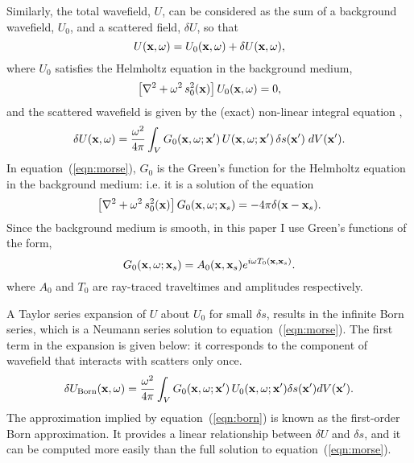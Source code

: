 \par
Similarly, the total wavefield, $U$, can be considered 
as the sum of a background wavefield, $U_0$, and a
scattered field, $\delta U$, so that 
\begin{equation}
U({\bf x},\omega)=U_0({\bf x},\omega)+\delta U({\bf x},\omega),
\end{equation}
where $U_0$ satisfies the Helmholtz equation in the background
medium,
\begin{equation}
\left[ \nabla^2 + \omega^2 \, s_0^2({\bf x})\right]
U_0({\bf x},\omega) = 0,
\end{equation}
and the scattered wavefield is given by the (exact) non-linear
integral equation \cite[]{morsefeshbach}, 
\begin{equation}\label{eqn:morse}
\delta U({\bf x},\omega)=\frac{\omega^2}{4 \pi}
\int_V G_0({\bf x},\omega; {\bf x}')\,U({\bf x},\omega; {\bf x}')
\, \delta s({\bf x}') \; dV({\bf x}').
\end{equation}
In equation~(\ref{eqn:morse}), $G_0$ is the Green's function for
the Helmholtz equation in the background medium:  
i.e. it is a solution of the equation
\begin{equation}
\left[ \nabla^2 + \omega^2 \, s_0^2({\bf x})
\right] G_0({\bf x},\omega ; {\bf x}_s) = -4 \pi \delta({\bf x} - 
{\bf x}_s). 
\end{equation}
Since the background medium is smooth, in this paper I use Green's
functions of the form,
\begin{equation}
G_0({\bf x},\omega ; {\bf x}_s) = A_0({\bf x},{\bf x}_s)
e^{i \omega T_0({\bf x},{\bf x}_s)}.
\end{equation}
where $A_0$ and $T_0$ are ray-traced traveltimes and amplitudes
respectively.

\par
A Taylor series expansion of $U$ about $U_0$ for small $\delta s$,
results in the infinite Born series, which is a Neumann series
solution \cite[]{arfken} to equation~(\ref{eqn:morse}).
The first term in the expansion is given below: it corresponds
to the component of wavefield that interacts with scatters only once.
\begin{equation}\label{eqn:born}
\delta U_{\rm Born}({\bf x},\omega)=\frac{\omega^2}{4 \pi}
\int_V G_0({\bf x},\omega; {\bf x}')\,U_0({\bf x},\omega; {\bf x}')
\delta s({\bf x}') dV({\bf x}').
\end{equation}
The approximation implied by equation~(\ref{eqn:born}) is known as the
first-order Born approximation. It provides a linear relationship
between $\delta U$ and $\delta s$, and it can be computed more easily
than the full solution to equation~(\ref{eqn:morse}). 

